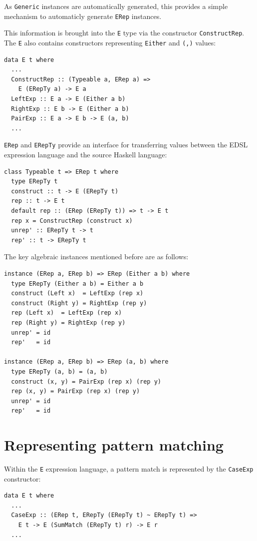 \documentclass[runningheads, a4paper]{llncs}
\newcommand{\ttt}{\texttt}
\begin{document}
As \ttt{Generic} instances are automatically generated, this provides a simple mechanism
to automaticly generate \ttt{ERep} instances.


This information is brought into the \ttt{E} type via the constructor
\ttt{ConstructRep}. The \ttt{E} also contains constructors representing \ttt{Either}
and \ttt{(,)} values:

\begin{lstlisting}
data E t where
  ...
  ConstructRep :: (Typeable a, ERep a) =>
    E (ERepTy a) -> E a
  LeftExp :: E a -> E (Either a b)
  RightExp :: E b -> E (Either a b)
  PairExp :: E a -> E b -> E (a, b)
  ...
\end{lstlisting}

\ttt{ERep} and \ttt{ERepTy} provide an interface for transferring values between the EDSL
expression language and the source Haskell language:

\begin{lstlisting}
class Typeable t => ERep t where
  type ERepTy t
  construct :: t -> E (ERepTy t)
  rep :: t -> E t
  default rep :: (ERep (ERepTy t)) => t -> E t
  rep x = ConstructRep (construct x)
  unrep' :: ERepTy t -> t
  rep' :: t -> ERepTy t
\end{lstlisting}

The key algebraic instances mentioned before are as follows:

\begin{lstlisting}
instance (ERep a, ERep b) => ERep (Either a b) where
  type ERepTy (Either a b) = Either a b
  construct (Left x)  = LeftExp (rep x)
  construct (Right y) = RightExp (rep y)
  rep (Left x)  = LeftExp (rep x)
  rep (Right y) = RightExp (rep y)
  unrep' = id
  rep'   = id

instance (ERep a, ERep b) => ERep (a, b) where
  type ERepTy (a, b) = (a, b)
  construct (x, y) = PairExp (rep x) (rep y)
  rep (x, y) = PairExp (rep x) (rep y)
  unrep' = id
  rep'   = id
\end{lstlisting}



\section{Representing pattern matching}
\label{sec:PatRep}

Within the \ttt{E} expression language, a pattern match is represented by the
\ttt{CaseExp} constructor:
\begin{lstlisting}
data E t where
  ...
  CaseExp :: (ERep t, ERepTy (ERepTy t) ~ ERepTy t) =>
    E t -> E (SumMatch (ERepTy t) r) -> E r
  ...
\end{lstlisting}
\end{document}
